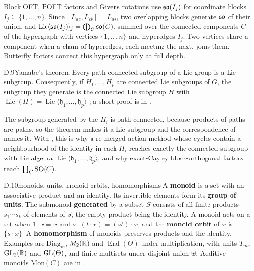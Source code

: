 Block OFT, BOFT \citep{liu2023parameter} factors and Givens rotations \citep{ma2024parameter} use $\mathfrak{so}(I_j)$ for
coordinate blocks $I_j\subseteq\{1,\dots,n\}$. Since $[L_{ac},L_{cb}]=L_{ab}$, two overlapping blocks generate $\mathfrak{so}$ of
their union, and $\operatorname{Lie}\langle\mathfrak{so}(I_j)\rangle_j=\bigoplus_C\mathfrak{so}(C)$, summed over the connected components
$C$ of the hypergraph with vertices $\{1,\dots,n\}$ and hyperedges $I_j$. Two vertices share a component when a chain of
hyperedges, each meeting the next, joins them. Butterfly factors connect this hypergraph only at full depth.


\begin{bgfact}{D.9}{Yamabe's theorem}
Every path-connected subgroup of a Lie group is a Lie subgroup. Consequently, if $H_1,\dots,H_p$ are connected Lie
subgroups of $G$, the subgroup they generate is the connected Lie subgroup $H$ with
$\operatorname{Lie}(H)=\operatorname{Lie}\langle\mathfrak h_1,\dots,\mathfrak h_p\rangle$ \citep{xyamabe1950arcwise}; a
short proof is in \citet{xgoto1969arcwise}.
\end{bgfact}

The subgroup generated by the $H_i$ is path-connected, because products of paths are paths, so the theorem makes it a
Lie subgroup and the correspondence of  names it. With , this is why a re-merged action method
whose cycles contain a neighbourhood of the identity in each $H_i$ reaches exactly the connected subgroup with Lie
algebra $\operatorname{Lie}\langle\mathfrak h_1,\dots,\mathfrak h_p\rangle$, and why exact-Cayley block-orthogonal
factors reach $\prod_C\mathrm{SO}(C)$.


\begin{bgentry}{D.10}{monoids, units, monoid orbits, homomorphisms}
A \textbf{monoid} is a set with an associative product and an identity. Its invertible elements form its \textbf{group
of units}. The submonoid \textbf{generated} by a subset $S$ consists of all finite products $s_1\cdots s_k$ of elements
of $S$, the empty product being the identity. A monoid acts on a set when $1\cdot x=x$ and $s\cdot(t\cdot x)=(st)\cdot
x$, and the \textbf{monoid orbit} of $x$ is $\{s\cdot x\}$. A \textbf{homomorphism} of monoids preserves products and
the identity. Examples are $\mathrm{Diag}_m$, $M_2(\mathbb{R})$ and $\operatorname{End}(\Theta)$ under multiplication, with
units $T_m$, $\mathrm{GL}_2(\mathbb{R})$ and $\mathrm{GL}(\Theta)$, and finite multisets under disjoint union $\uplus$. Additive monoids
$\mathrm{Mon}(C)$ are in .
\end{bgentry}

